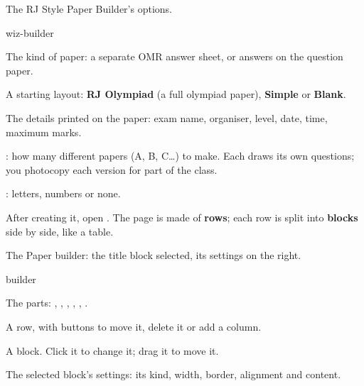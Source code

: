 \documentclass[11pt]{article}
\begin{document}
\begin{keep}
\begin{guidefig}{The RJ Style Paper Builder's options.}
\begin{shot}{wiz-builder}
\end{shot}
\end{guidefig}
\begin{callouts}
  \item The kind of paper: a separate OMR answer sheet, or answers on the question paper.
  \item A starting layout: \textbf{RJ Olympiad} (a full olympiad paper), \textbf{Simple} or \textbf{Blank}.
  \item The details printed on the paper: exam name, organiser, level, date, time, maximum marks.
  \item {}: how many different papers (A, B, C\ldots) to make. Each draws its own questions; you photocopy each version for part of the class.
  \item {}: letters, numbers or none.
\end{callouts}
\end{keep}

After creating it, open  \textrightarrow{} . The page is made of \textbf{rows}; each row is split into \textbf{blocks} side by side, like a table.

\begin{keep}
\begin{guidefig}{The Paper builder: the title block selected, its settings on the right.}
\begin{shot}{builder}
\end{shot}
\end{guidefig}
\begin{callouts}
  \item The parts: , , , , , .
  \item A row, with buttons to move it, delete it or add a column.
  \item A block. Click it to change it; drag it to move it.
  \item The selected block's settings: its kind, width, border, alignment and content.
\end{callouts}
\end{keep}
\end{document}
